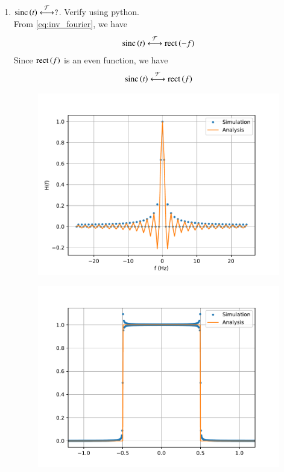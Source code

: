\documentclass[journal,12pt,twocolumn]{IEEEtran}
\renewcommand\thesection{\arabic{section}}
\begin{document}
\begin{enumerate}[label=\thesection.\arabic*
,ref=\thesection.\theenumi]
\item 
$\text{sinc}\left(t\right)\overset{\mathcal{F}}{ \longleftrightarrow}?$. Verify using python. \\
\solution From \eqref{eq:inv_fourier}, we have 
\begin{align}
	\text{sinc}\left(t\right)\overset{\mathcal{F}}{ \longleftrightarrow}\text{rect}\left(-f\right)
    \label{eq:fourier-sinc}
\end{align}
Since $\text{rect}\left(f\right)$ is an even function, we have 
\begin{align}
	\text{sinc}\left(t\right) \overset{\mathcal{F}}{ \longleftrightarrow} \text{rect}\left(f\right)
\end{align}
\begin{figure}
	\centering
	\includegraphics[width=\columnwidth]{figs/3_9.pdf}
\end{figure}
\begin{figure}[!ht]
	\includegraphics[width=\columnwidth]{figs/3_10.pdf}
\end{figure}
\end{enumerate}
\end{document}
